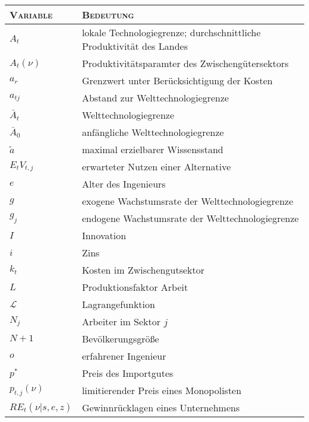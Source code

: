 \begin{longtable}{l|l} %

	\textsc{Variable} & \textsc{Bedeutung}\\
	\hline
	\endhead
	
	\endfoot

		${A}_{t} $ & lokale Technologiegrenze; durchschnittliche Produktivität des Landes\\
		$A_{t}(\nu)$ & Produktivitätsparamter des Zwischeng\"utersektors\\
		$a_{r}$ & Grenzwert unter Berücksichtigung der Kosten\\
		$a_{tj}$ & Abstand zur Welttechnologiegrenze\\%
		$\bar{A}_{t} $ & Welttechnologiegrenze\\
		$\bar{A}_{0}$ & anf\"angliche Welttechnologiegrenze\\
		$\tilde{a}$ & maximal erzielbarer Wissensstand \\
		$E_{t}V_{t,j}$ & erwarteter Nutzen einer Alternative\\
		$e$ & Alter des Ingenieurs\\
		$g$ & exogene Wachstumsrate der Welttechnologiegrenze\\
		$g_{j}$ & endogene Wachstumsrate der Welttechnologiegrenze\\
		$I$ & Innovation\\
		$i$& Zins\\
		$k_t$ & Kosten im Zwischengutsektor\\
		$L$ & Produktionsfaktor Arbeit\\
		$\mathcal{L}$ & Lagrangefunktion\\
		$N_{j}$ & Arbeiter im Sektor $j$\\
		$N+1$ & Bev\"olkerungsgrö{\ss}e\\
		$o$ & erfahrener Ingenieur\\
		$p^*$ & Preis des Importgutes\\
		$p_{t,j}(\nu)$ & limitierender Preis eines Monopolisten\\
		$RE_{t}(\nu|s,e,z)$ & Gewinnrücklagen eines Unternehmens\\

\end{longtable}
